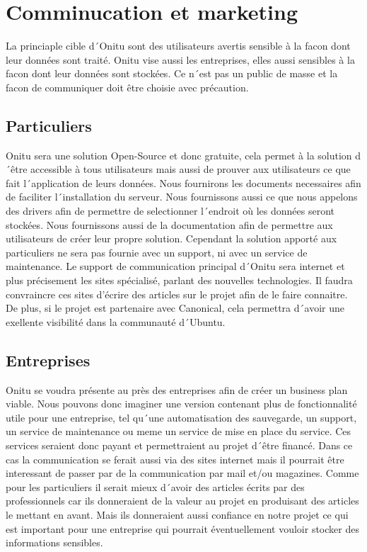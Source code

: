 \section{Comminucation et marketing}
La princiaple cible d´Onitu sont des utilisateurs avertis sensible à la facon dont leur données sont traité. Onitu vise aussi les entreprises, elles aussi sensibles à la facon dont leur données sont stockées. Ce n´est pas un public de masse et la facon de communiquer doit être choisie avec précaution.

\subsection{Particuliers}
Onitu sera une solution Open-Source et donc gratuite, cela permet à la solution d´être accessible à tous utilisateurs mais aussi de prouver aux utilisateurs ce que fait l´application de leurs données. Nous fournirons les documents necessaires afin de faciliter l´installation du serveur. Nous fournissons aussi ce que nous appelons des drivers afin de permettre de selectionner l´endroit où les données seront stockées. Nous fournissons aussi de la documentation afin de permettre aux utilisateurs de créer leur propre solution. Cependant la solution apporté aux particuliers ne sera pas fournie avec un support, ni avec un service de maintenance.
Le support de communication principal d´Onitu sera internet et plus précisement les sites spécialisé, parlant des nouvelles technologies. Il faudra convraincre ces sites d'écrire des articles sur le projet afin de le faire connaitre. De plus, si le projet est partenaire avec Canonical, cela permettra d´avoir une exellente visibilité dans la communauté d´Ubuntu.

\subsection{Entreprises}
Onitu se voudra présente au près des entreprises afin de créer un business plan viable. Nous pouvons donc imaginer une version contenant plus de fonctionnalité utile pour une entreprise, tel qu´une automatisation des sauvegarde, un support, un service de maintenance ou meme un service de mise en place du service. Ces services seraient donc payant et permettraient au projet d´être financé. Dans ce cas la communication se ferait aussi via des sites internet mais il pourrait être interessant de passer par de la communication par mail et/ou magazines. Comme pour les particuliers il serait mieux d´avoir des articles écrits par des professionnels car ils donneraient de la valeur au projet en produisant des articles le mettant en avant. Mais ils donneraient aussi confiance en notre projet ce qui est important pour une entreprise qui pourrait éventuellement vouloir stocker des informations sensibles.
